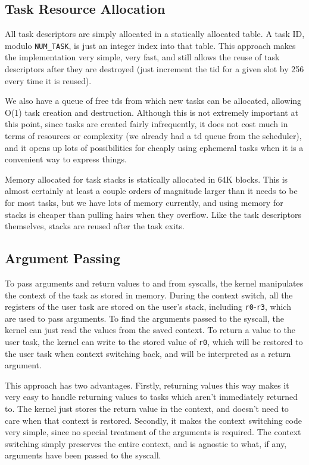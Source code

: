 \documentclass[titlepage]{article}
\begin{document}
\subsection{Task Resource Allocation}
All task descriptors are simply allocated in a statically allocated table.
A task ID, modulo \texttt{NUM\_TASK}, is just an integer index into that table.
This approach makes the implementation very simple, very fast, and still allows
the reuse of task descriptors after they are destroyed (just increment the tid
for a given slot by 256 every time it is reused).

We also have a queue of free tds from which new tasks can be allocated,
allowing O(1) task creation and destruction. Although this is not extremely
important at this point, since tasks are created fairly infrequently, it does
not cost much in terms of resources or complexity (we already had a td queue
from the scheduler), and it opens up lots of possibilities for cheaply using
ephemeral tasks when it is a convenient way to express things.

Memory allocated for task stacks is statically allocated in 64K blocks. This
is almost certainly at least a couple orders of magnitude larger than it needs
to be for most tasks, but we have lots of memory currently, and using memory
for stacks is cheaper than pulling hairs when they overflow.
Like the task descriptors themselves, stacks are reused after the task exits.

\subsection{Argument Passing}
To pass arguments and return values to and from syscalls, the kernel manipulates
the context of the task as stored in memory.
During the context switch, all the registers of the user task are stored on the
user's stack, including \texttt{r0}-\texttt{r3}, which are used to pass arguments.
To find the arguments passed to the syscall, the kernel can just read the values
from the saved context.
To return a value to the user task, the kernel can write to the stored value of
\texttt{r0}, which will be restored to the user task when context switching back,
and will be interpreted as a return argument.

This approach has two advantages.
Firstly, returning values this way makes it very easy to handle returning values
to tasks which aren't immediately returned to.
The kernel just stores the return value in the context, and doesn't need to care
when that context is restored.
Secondly, it makes the context switching code very simple, since no special treatment
of the arguments is required.
The context switching simply preserves the entire context, and is agnostic to what,
if any, arguments have been passed to the syscall.
\end{document}
